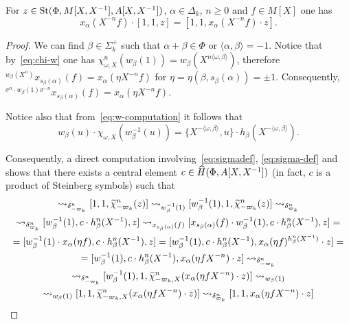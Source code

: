 \begin{lemma} \label{lem:family2}
    For $z \in \operatorname{St}(\Phi, M[X, X^{-1}], A[X, X^{-1}])$, $\alpha \in \Delta_k$, $n \geq 0$ and $f \in M[X]$ one has
    \begin{equation*} x_\alpha(X^{-n} f) \cdot [1, 1, z] = [1, 1, x_\alpha(X^{-n} f) \cdot z]. \end{equation*}
\end{lemma}
\begin{proof}
    We can find $\beta \in \Sigma_k^+$ such that $\alpha + \beta \in \Phi$ or $\langle \alpha, \beta \rangle = -1$.
    Notice that by~\eqref{eq:chi-w} one has $\chi_{\omega, X}^n(w_\beta(1)) = w_\beta(X^{n\langle \omega, \beta \rangle})$, therefore
    ${}^{w_\beta(X^n)} x_{s_\beta(\alpha)}(f) = x_\alpha(\eta X^{-n} f)$
    for $\eta = \eta(\beta, s_\beta(\alpha)) = \pm 1$.
    Consequently, ${}^{\sigma^n \cdot w_\beta(1) \sigma^{-n}} x_{s_\beta(\alpha)}(f) = x_\alpha(\eta X^{-n} f)$.

    Notice also that from~\eqref{eq:w-computation} it follows that
     \[ w_\beta(u) \cdot \chi_{\omega, X}(w^{-1}_\beta(u)) = \{ X^{-\langle \omega, \beta \rangle }, u \} \cdot h_\beta(X^{-\langle \omega, \beta \rangle}). \]

    Consequently, a direct computation involving~\eqref{eq:sigmadef}, \eqref{eq:sigma-def} and~\cite[Lemme~5.1--5.2]{Ma69}
     shows that there exists a central element $c \in \widehat{H}(\Phi, A[X, X^{-1}])$ (in fact, $c$ is a product of Steinberg symbols) such that
    \begin{multline*}
        [1, 1, z] \rightsquigarrow_{\delta_{-\varpi_k}^n}
        [1, 1, \widetilde{\chi}_{-\varpi_k}^n(z)] \rightsquigarrow_{w^{-1}_\beta(1)}
        [w_\beta^{-1}(1), 1, \widetilde{\chi}_{-\varpi_k}^n(z)] \rightsquigarrow_{\delta_{\varpi_k}^n} \\
        \rightsquigarrow_{\delta_{\varpi_k}^n} [w_\beta^{-1}(1), c \cdot h_\beta^n(X^{-1}), z] \rightsquigarrow_{x_{s_\beta(\alpha)}(f)}
        [x_{s_\beta(\alpha)}(f) \cdot w_\beta^{-1}(1), c \cdot h_\beta^n(X^{-1}), z] = \\
        = [w_\beta^{-1}(1) \cdot x_{\alpha}(\eta f), c \cdot h_\beta^n(X^{-1}), z] =
          [w_\beta^{-1}(1), c \cdot h_\beta^n(X^{-1}), x_{\alpha}(\eta f)^{h_\beta^n(X^{-1})} \cdot z] = \\
        = [w_\beta^{-1}(1), c \cdot h_\beta^n(X^{-1}), x_{\alpha}(\eta fX^{-n}) \cdot z] \rightsquigarrow_{\delta_{-\varpi_k}^n} \\
        \rightsquigarrow_{\delta_{-\varpi_k}^n} [w_\beta^{-1}(1), 1, \widetilde{\chi}_{-\varpi_k, X}^n (x_{\alpha}(\eta fX^{-n}) \cdot z)] \rightsquigarrow_{ w_\beta(1) } \\
        \rightsquigarrow_{ w_\beta(1) } [1, 1, \widetilde{\chi}_{-\varpi_k, X}^n (x_{\alpha}(\eta fX^{-n}) \cdot z)] \rightsquigarrow_{\delta_{\varpi_k}^n}
          [1, 1, x_{\alpha}(\eta fX^{-n}) \cdot z] \qedhere
    \end{multline*}
\end{proof}

